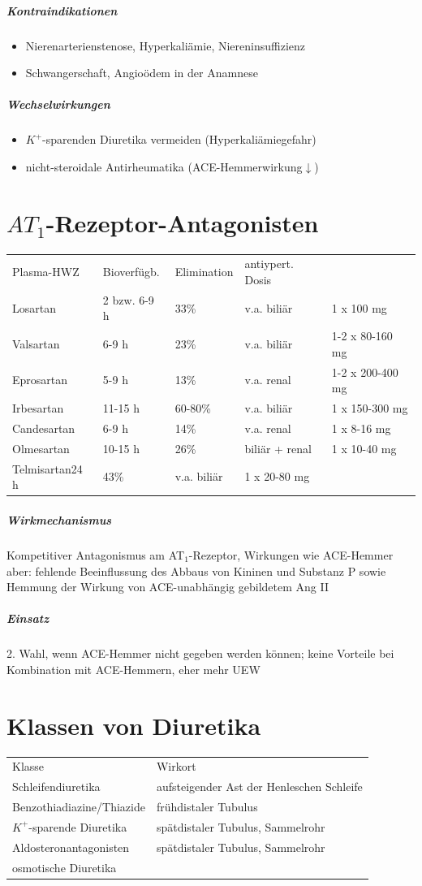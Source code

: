 \documentclass[10pt,a4paper]{report}
\begin{document}
\subparagraph{Kontraindikationen}
\begin{itemize}
	\item Nierenarterienstenose, Hyperkaliämie, Niereninsuffizienz
	\item Schwangerschaft, Angioödem in der Anamnese
\end{itemize}
\subparagraph{Wechselwirkungen}
\begin{itemize}
	\item $K^+$-sparenden Diuretika vermeiden (Hyperkaliämiegefahr)
	\item nicht-steroidale Antirheumatika (ACE-Hemmerwirkung$\downarrow$)
\end{itemize}
\section{$AT_1$-Rezeptor-Antagonisten}
\begin{tabularx}{\textwidth}{XXXXX}
Plasma-HWZ&Bioverfügb.&Elimination&antiypert. Dosis\\
Losartan&2 bzw. 6-9 h&33\%&v.a. biliär&1 x 100 mg\\	
Valsartan&6-9 h&23\%&v.a. biliär&1-2 x 80-160 mg\\
Eprosartan&5-9 h&13\%&v.a. renal&1-2 x 200-400 mg\\
Irbesartan&11-15 h&60-80\%&	v.a. biliär&1 x 150-300 mg\\ 
Candesartan&6-9 h&14\%&v.a. renal&1 x 8-16 mg\\	
Olmesartan&10-15 h&26\%&biliär + renal&1 x 10-40 mg\\
Telmisartan24 h&43\%&v.a. biliär&1 x 20-80 mg\\ 
\end{tabularx}
\subparagraph{Wirkmechanismus}Kompetitiver Antagonismus am AT$_1$-Rezeptor, Wirkungen wie ACE-Hemmer aber:	fehlende Beeinflussung des Abbaus von Kininen und Substanz P sowie Hemmung der Wirkung von ACE-unabhängig gebildetem Ang II
\subparagraph{Einsatz} 2. Wahl, wenn ACE-Hemmer nicht gegeben werden können; keine Vorteile bei Kombination mit ACE-Hemmern, eher mehr UEW
\section{Klassen von Diuretika}
\begin{tabularx}{\textwidth}{XX}
Klasse&Wirkort\\
Schleifendiuretika&aufsteigender Ast der Henleschen Schleife\\
Benzothiadiazine/Thiazide&frühdistaler Tubulus\\
$K^+$-sparende Diuretika&spätdistaler Tubulus, Sammelrohr\\
Aldosteronantagonisten&	spätdistaler Tubulus, Sammelrohr\\
osmotische Diuretika&\\
\end{tabularx}
\end{document}
